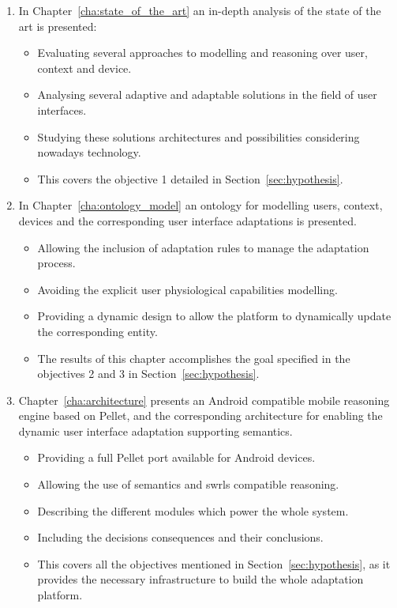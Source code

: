 \begin{enumerate}[label=\alph*)]
  \item In Chapter~\ref{cha:state_of_the_art} an in-depth analysis of the state 
  of the art is presented:
  \begin{itemize}
    \item Evaluating several approaches to modelling and reasoning over user,
    context and device.
    \item Analysing several adaptive and adaptable solutions in the field of
    user interfaces.
    \item Studying these solutions architectures and possibilities considering
    nowadays technology.
    \item This covers the objective 1 detailed in Section~\ref{sec:hypothesis}.
  \end{itemize}
  
  \item In Chapter~\ref{cha:ontology_model} an ontology for modelling users, 
  context, devices and the corresponding user interface adaptations is presented.
  \begin{itemize}
    \item Allowing the inclusion of adaptation rules to manage the adaptation 
    process.
    \item Avoiding the explicit user physiological capabilities modelling.
    \item Providing a dynamic design to allow the platform to dynamically update
    the corresponding entity.
    \item The results of this chapter accomplishes the goal specified in the
    objectives 2 and 3 in Section~\ref{sec:hypothesis}.
  \end{itemize}

  \item Chapter~\ref{cha:architecture} presents an Android compatible mobile 
  reasoning engine based on Pellet, and the corresponding architecture
  for enabling the dynamic user interface adaptation supporting semantics.
  \begin{itemize}
    \item Providing a full Pellet port available for Android devices.
    \item Allowing the use of semantics and \acp{swrl} compatible reasoning.
    \item Describing the different modules which power the whole system.
    \item Including the decisions consequences and their conclusions.
    \item This covers all the objectives mentioned in Section~\ref{sec:hypothesis},
    as it provides the necessary infrastructure to build the whole adaptation
    platform.
  \end{itemize}


\end{enumerate}
